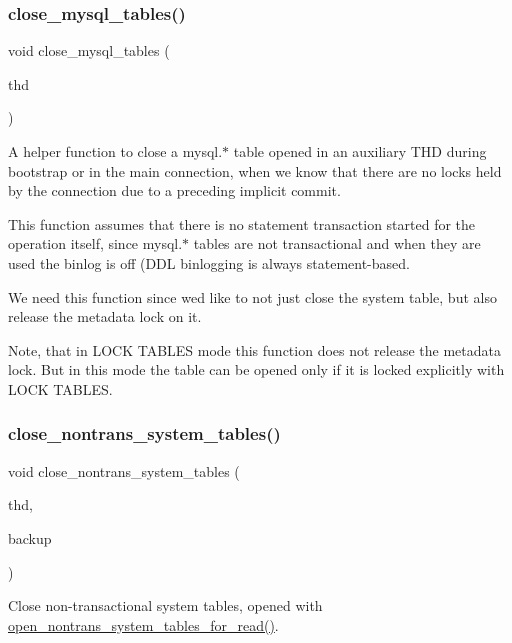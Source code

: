 \subsubsection{\texorpdfstring{close\+\_\+mysql\+\_\+tables()}{close\_mysql\_tables()}}
{\footnotesize\ttfamily void close\+\_\+mysql\+\_\+tables (\begin{DoxyParamCaption}\item[{T\+HD $\ast$}]{thd }\end{DoxyParamCaption})}

A helper function to close a mysql.$\ast$ table opened in an auxiliary T\+HD during bootstrap or in the main connection, when we know that there are no locks held by the connection due to a preceding implicit commit.

This function assumes that there is no statement transaction started for the operation itself, since mysql.$\ast$ tables are not transactional and when they are used the binlog is off (D\+DL binlogging is always statement-\/based.

We need this function since we\textquotesingle{}d like to not just close the system table, but also release the metadata lock on it.

Note, that in L\+O\+CK T\+A\+B\+L\+ES mode this function does not release the metadata lock. But in this mode the table can be opened only if it is locked explicitly with L\+O\+CK T\+A\+B\+L\+ES. \mbox{\label{group__Data__Dictionary_ga4d367b48b7597012ac308bbbdaa0aca2}} 
\subsubsection{\texorpdfstring{close\+\_\+nontrans\+\_\+system\+\_\+tables()}{close\_nontrans\_system\_tables()}}
{\footnotesize\ttfamily void close\+\_\+nontrans\+\_\+system\+\_\+tables (\begin{DoxyParamCaption}\item[{T\+HD $\ast$}]{thd,  }\item[{Open\+\_\+tables\+\_\+backup $\ast$}]{backup }\end{DoxyParamCaption})}

Close non-\/transactional system tables, opened with \mbox{\hyperlink{group__Data__Dictionary_ga5564f0cf7807256a52a9455fd4f45d4e}{open\+\_\+nontrans\+\_\+system\+\_\+tables\+\_\+for\+\_\+read()}}.


